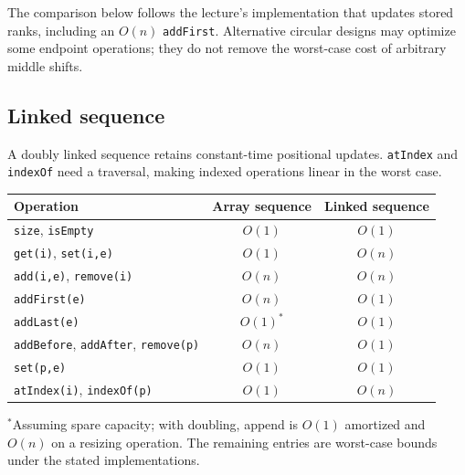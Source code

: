 \documentclass[11pt]{article}
\begin{document}
The comparison below follows the lecture's implementation that updates stored ranks, including an $O(n)$ \texttt{addFirst}. Alternative circular designs may optimize some endpoint operations; they do not remove the worst-case cost of arbitrary middle shifts.

\subsection{Linked sequence}
A doubly linked sequence retains constant-time positional updates. \texttt{atIndex} and \texttt{indexOf} need a traversal, making indexed operations linear in the worst case.

\begin{center}
\begin{tabularx}{\textwidth}{Xcc}
\toprule
Operation & Array sequence & Linked sequence\\
\midrule
\texttt{size}, \texttt{isEmpty} & $O(1)$ & $O(1)$\\
\texttt{get(i)}, \texttt{set(i,e)} & $O(1)$ & $O(n)$\\
\texttt{add(i,e)}, \texttt{remove(i)} & $O(n)$ & $O(n)$\\
\texttt{addFirst(e)} & $O(n)$ & $O(1)$\\
\texttt{addLast(e)} & $O(1)^*$ & $O(1)$\\
\texttt{addBefore}, \texttt{addAfter}, \texttt{remove(p)} & $O(n)$ & $O(1)$\\
\texttt{set(p,e)} & $O(1)$ & $O(1)$\\
\texttt{atIndex(i)}, \texttt{indexOf(p)} & $O(1)$ & $O(n)$\\
\bottomrule
\end{tabularx}
\end{center}
$^*$Assuming spare capacity; with doubling, append is $O(1)$ amortized and $O(n)$ on a resizing operation. The remaining entries are worst-case bounds under the stated implementations.
\end{document}
